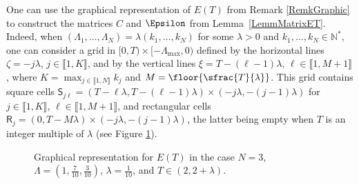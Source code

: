 \begin{remk}
\label{RemkGraphCommens}
One can use the graphical representation of $E(T)$ from Remark \ref{RemkGraphic} to construct the matrices $C$ and $\Epsilon$ from Lemma~\ref{LemmMatrixET}. Indeed, when $(\Lambda_1, \dots, \Lambda_N) = \lambda (k_1, \dots, k_N)$ for some $\lambda > 0$ and $k_1, \dots, k_N \in \mathbb N^\ast$, one can consider a grid in $[0, T) \times [-\Lambda_{\max}, 0)$ defined by the horizontal lines $\zeta = -j\lambda$, $j \in \llbracket 1, K\rrbracket$, and by the vertical lines $\xi = T - (\ell - 1)\lambda$, $\ell \in \llbracket 1, M+1\rrbracket$, where $K = \max_{j \in \llbracket 1, N\rrbracket} k_j$ and $M = \floor{\sfrac{T}{\lambda}}$. This grid contains square cells $\mathsf S_{j\ell} = (T - \ell\lambda, T - (\ell - 1)\lambda) \times (-j\lambda, -(j-1)\lambda)$ for $j \in \llbracket 1, K\rrbracket$, $\ell \in \llbracket 1, M+1\rrbracket$, and rectangular cells $\mathsf R_j = (0, T - M\lambda) \times (-j\lambda, -(j-1)\lambda)$, the latter being empty when $T$ is an integer multiple of $\lambda$ (see Figure \ref{FigETMatrix}).

\begin{figure}[ht]
\centering

\caption{Graphical representation for $E(T)$ in the case $N = 3$, $\Lambda = \left(1, \frac{7}{10}, \frac{3}{10}\right)$, $\lambda = \frac{1}{10}$, and $T \in (2, 2 + \lambda)$.}
\label{FigETMatrix}
\end{figure}


\end{remk}
